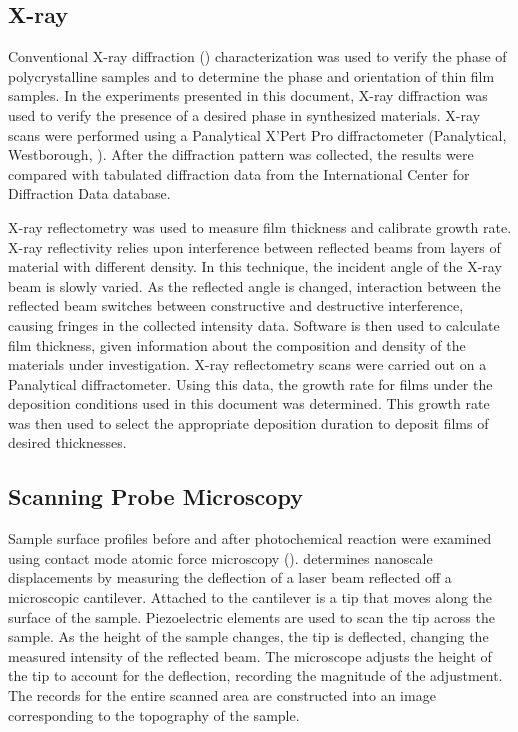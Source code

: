 \subsection{X-ray}
\label{subsec:exp.xray}


Conventional X-ray diffraction () characterization was used to verify the phase
of polycrystalline samples and to determine the phase and orientation of thin film
samples. In the experiments presented in this document, X-ray diffraction was used to
verify the presence of a desired phase in synthesized materials. X-ray scans were
performed using a Panalytical X'Pert Pro  diffractometer (Panalytical,
Westborough, ). After the diffraction pattern was collected, the results were
compared with tabulated diffraction data from the International Center for Diffraction
Data database. 

X-ray reflectometry\cite{birkholz2006thin} was used to measure film thickness and
calibrate growth rate. X-ray reflectivity relies upon interference between reflected beams
from layers of material with different density. In this technique, the incident angle of
the X-ray beam is slowly varied. As the reflected angle is changed, interaction between
the reflected beam switches between constructive and destructive interference, causing
fringes in the collected intensity data. Software is then used to calculate film
thickness, given information about the composition and density of the materials under
investigation. X-ray reflectometry scans were carried out on a Panalytical diffractometer.
Using this data, the growth rate for films under the deposition conditions used in this
document was determined. This growth rate was then used to select the appropriate
deposition duration to deposit films of desired thicknesses. 


\subsection{Scanning Probe Microscopy}
\label{subsec:exp.scanningprobe}


Sample surface profiles before and after photochemical reaction were examined using
contact mode atomic force microscopy ().  determines nanoscale
displacements by measuring the deflection of a laser beam reflected off a microscopic
cantilever.\cite{Murphy:1987wc} Attached to the cantilever is a tip that moves along the
surface of the sample. Piezoelectric elements are used to scan the tip across the sample.
As the height of the sample changes, the tip is deflected, changing the measured intensity
of the reflected beam. The microscope adjusts the height of the tip to account for the
deflection, recording the magnitude of the adjustment. The records for the entire scanned
area are constructed into an image corresponding to the topography of the sample. 


